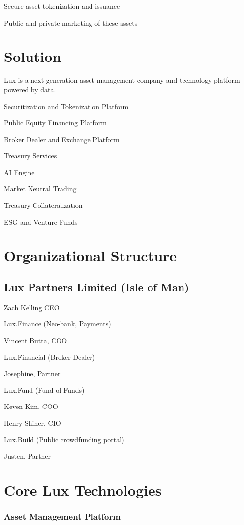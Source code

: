 \documentclass[11pt]{article}
\begin{document}
Secure asset tokenization and issuance


Public and private marketing of these assets


\section{Solution}

Lux is a next-generation asset management company and technology platform powered by data.


Securitization and Tokenization Platform


Public Equity Financing Platform


Broker Dealer and Exchange Platform


Treasury Services


AI Engine


Market Neutral Trading


Treasury Collateralization


ESG and Venture Funds


\section{Organizational Structure}

\subsection{Lux Partners Limited (Isle of Man)}

Zach Kelling CEO


Lux.Finance (Neo-bank, Payments)


Vincent Butta, COO


Lux.Financial (Broker-Dealer)


Josephine, Partner


Lux.Fund (Fund of Funds)


Keven Kim, COO


Henry Shiner, CIO


Lux.Build (Public crowdfunding portal)


Justen, Partner


\section{Core Lux Technologies}

\subsubsection{Asset Management Platform}
\end{document}
